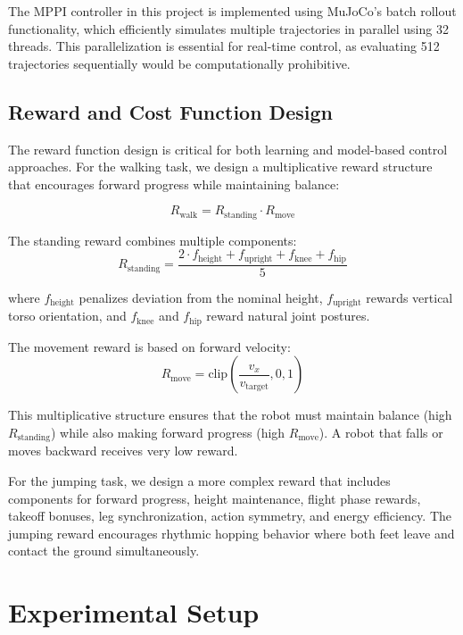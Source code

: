 \documentclass[conference]{IEEEtran}
\begin{document}
The MPPI controller in this project is implemented using MuJoCo's batch rollout functionality, which efficiently simulates multiple trajectories in parallel using 32 threads. This parallelization is essential for real-time control, as evaluating 512 trajectories sequentially would be computationally prohibitive.

\subsection{Reward and Cost Function Design}

The reward function design is critical for both learning and model-based control approaches. For the walking task, we design a multiplicative reward structure that encourages forward progress while maintaining balance:

\begin{equation}
R_{\text{walk}} = R_{\text{standing}} \cdot R_{\text{move}}
\end{equation}

The standing reward combines multiple components:
\begin{equation}
R_{\text{standing}} = \frac{2 \cdot f_{\text{height}} + f_{\text{upright}} + f_{\text{knee}} + f_{\text{hip}}}{5}
\end{equation}

where $f_{\text{height}}$ penalizes deviation from the nominal height, $f_{\text{upright}}$ rewards vertical torso orientation, and $f_{\text{knee}}$ and $f_{\text{hip}}$ reward natural joint postures.

The movement reward is based on forward velocity:
\begin{equation}
R_{\text{move}} = \text{clip}\left(\frac{v_x}{v_{\text{target}}}, 0, 1\right)
\end{equation}

This multiplicative structure ensures that the robot must maintain balance (high $R_{\text{standing}}$) while also making forward progress (high $R_{\text{move}}$). A robot that falls or moves backward receives very low reward.

For the jumping task, we design a more complex reward that includes components for forward progress, height maintenance, flight phase rewards, takeoff bonuses, leg synchronization, action symmetry, and energy efficiency. The jumping reward encourages rhythmic hopping behavior where both feet leave and contact the ground simultaneously.

\section{Experimental Setup}
\end{document}
